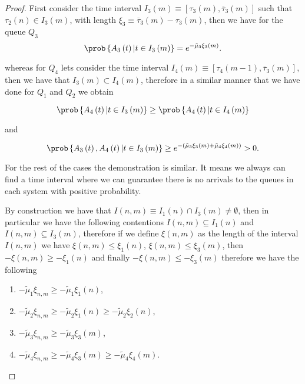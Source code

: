 \begin{proof}
First consider the time interval $I_{3}\left(m\right)\equiv\left[\tau_{3}\left(m\right),\overline{\tau}_{3}\left(m\right)\right]$ such that $\tau_{2}\left(n\right)\in I_{3}\left(m\right)$, with length $\xi_{3}\equiv\overline{\tau}_{3}\left(m\right)-\tau_{3}\left(m\right)$, then we have for the queue $Q_{3}$
\begin{equation}
\prob\left\{A_{3}\left(t\right)|t\in I_{3}\left(m\right)\right\}=e^{-\tilde{\mu}_{3}\xi_{3}\left(m\right)}.
\end{equation} 

whereas for $Q_{4}$ lets consider the time interval $I_{4}\left(m\right)\equiv\left[\tau_{4}\left(m-1\right),\overline{\tau}_{3}\left(m\right)\right]$, then we have that $I_{3}\left(m\right)\subset I_{4}\left(m\right)$, therefore in a similar manner that we have done for $Q_{1}$ and $Q_{2}$ we obtain


\begin{equation}
\prob\left\{A_{4}\left(t\right)|t\in I_{3}\left(m\right)\right\}\geq
\prob\left\{A_{4}\left(t\right)|t\in I_{4}\left(m\right)\right\}
\end{equation}

and

\begin{equation}
\prob\left\{A_{3}\left(t\right),A_{4}\left(t\right)|t\in I_{3}\left(m\right)\right\}\geq
e^{-\left(\tilde{\mu}_{3}\xi_{3}\left(m\right)+\tilde{\mu}_{4}\xi_{4}\left(m\right)\right)}>0.
\end{equation}


For the rest of the cases the demonstration is similar. It means we always can find a time interval where we can guarantee there is no arrivals to the queues in each system with positive probability.  


By construction we have that $I\left(n,m\right)\equiv I_{1}\left(n\right)\cap I_{3}\left(m\right)\neq\emptyset$, then in particular we have the following contentions $I\left(n,m\right)\subseteq I_{1}\left(n\right)$ and $I\left(n,m\right)\subseteq I_{3}\left(m\right)$, therefore if we define $\xi\left(n,m\right)$ as the length of the interval $I\left(n,m\right)$ we have $\xi\left(n,m\right)\leq\xi_{1}\left(n\right)$, $\xi\left(n,m\right)\leq\xi_{3}\left(m\right)$, then $-\xi\left(n,m\right)\geq-\xi_{1}\left(n\right)$ and finally $-\xi\left(n,m\right)\leq-\xi_{3}\left(m\right)$ therefore we have the following
\begin{multicols}{2}
\begin{enumerate}
\item $-\tilde{\mu}_{1}\xi_{n,m}\geq-\tilde{\mu}_{1}\xi_{1}\left(n\right)$,
\item $-\tilde{\mu}_{2}\xi_{n,m}\geq-\tilde{\mu}_{2}\xi_{1}\left(n\right)
\geq-\tilde{\mu}_{2}\xi_{2}\left(n\right)$,
\item $-\tilde{\mu}_{3}\xi_{n,m}\geq-\tilde{\mu}_{3}\xi_{3}\left(m\right)$,
\item $-\tilde{\mu}_{4}\xi_{n,m}\geq-\tilde{\mu}_{4}\xi_{3}\left(m\right)
\geq-\tilde{\mu}_{4}\xi_{4}\left(m\right).$
\end{enumerate}
\end{multicols}


\end{proof}
